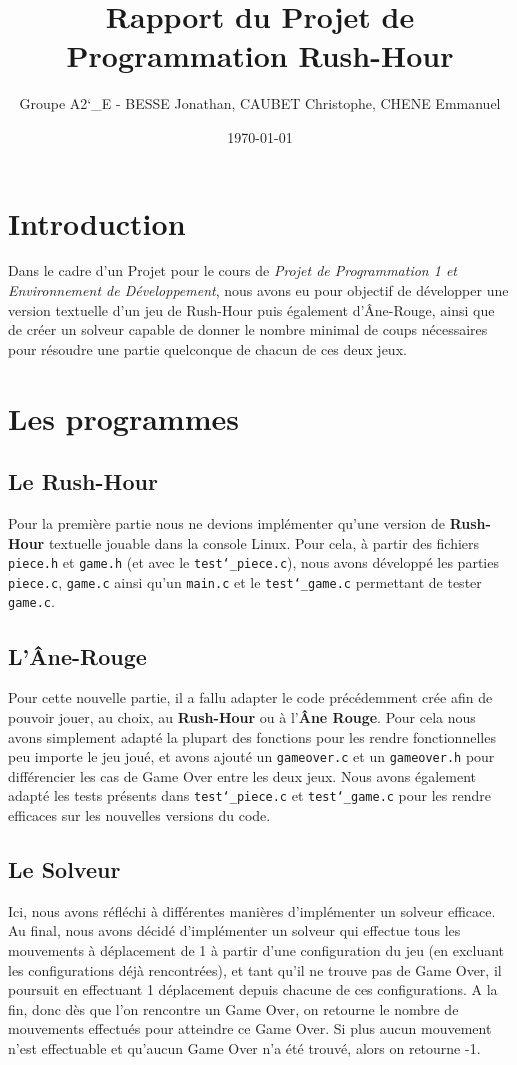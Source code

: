 \documentclass[12pt]{article}
\title{Rapport du Projet de Programmation Rush-Hour}
\author{Groupe A2\char`_E - BESSE Jonathan, CAUBET Christophe, CHENE Emmanuel}
\date\today
\begin{document}
\maketitle
\lstset{language=C,basicstyle=\small\tt}

\tableofcontents
\section*{Introduction}
Dans le cadre d'un Projet pour le cours de \textit{Projet de Programmation 1 et Environnement de Développement}, nous avons eu pour objectif de développer une version textuelle d'un jeu de Rush-Hour puis également d'Âne-Rouge, ainsi que de créer un solveur capable de donner le nombre minimal de coups nécessaires pour résoudre une partie quelconque de chacun de ces deux jeux.

\section{Les programmes}
\subsection{Le Rush-Hour}
Pour la première partie nous ne devions implémenter qu'une version de \textbf{Rush-Hour} textuelle jouable dans la console Linux.
Pour cela, à partir des fichiers \texttt{piece.h} et \texttt{game.h} (et avec le \texttt{test\char`_piece.c}), nous avons développé les parties \texttt{piece.c}, \texttt{game.c} ainsi qu'un \texttt{main.c} et le \texttt{test\char`_game.c} permettant de tester \texttt{game.c}.

\subsection{L'Âne-Rouge}
Pour cette nouvelle partie, il a fallu adapter le code précédemment crée afin de pouvoir jouer, au choix, au \textbf{Rush-Hour} ou à l'\textbf{Âne Rouge}.
Pour cela nous avons simplement adapté la plupart des fonctions pour les rendre fonctionnelles peu importe le jeu joué, et avons ajouté un \texttt{gameover.c} et un \texttt{gameover.h} pour différencier les cas de Game Over entre les deux jeux.
Nous avons également adapté les tests présents dans \texttt{test\char`_piece.c} et \texttt{test\char`_game.c} pour les rendre efficaces sur les nouvelles versions du code.

\subsection{Le Solveur}
Ici, nous avons réfléchi à différentes manières d'implémenter un solveur efficace.
Au final, nous avons décidé d'implémenter un solveur qui effectue tous les mouvements à déplacement de 1 à partir d'une configuration du jeu (en excluant les configurations déjà rencontrées), et tant qu'il ne trouve pas de Game Over, il poursuit en effectuant 1 déplacement depuis chacune de ces configurations.
A la fin, donc dès que l'on rencontre un Game Over, on retourne le nombre de mouvements effectués pour atteindre ce Game Over.
Si plus aucun mouvement n'est effectuable et qu'aucun Game Over n'a été trouvé, alors on retourne -1.
\end{document}
